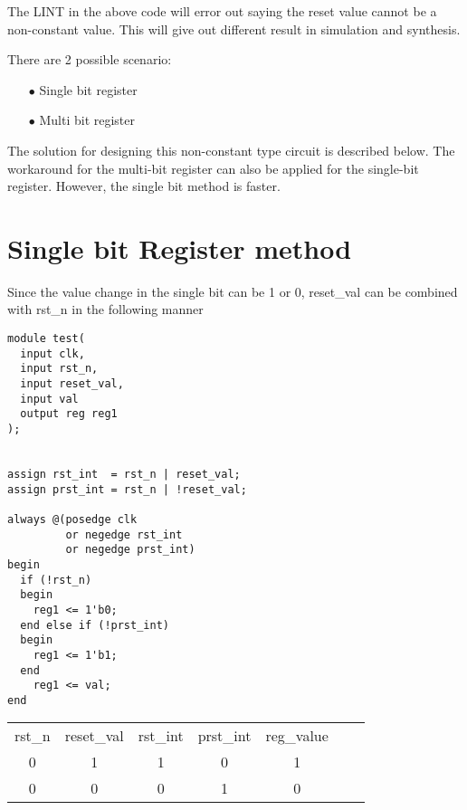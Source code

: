\documentclass[twocolumn,10pt]{asme2ej}
\begin{document}
The LINT in the above code will error out saying the reset value cannot be a non-constant value. This will give out different result in simulation and synthesis. 

There are 2 possible scenario:
\begin{itemize}
  \item[$\bullet$] Single bit register
  \item[$\bullet$] Multi bit register
\end{itemize}

The solution for designing this non-constant type circuit is described below. The workaround for the multi-bit register can also be applied for the single-bit register. However, the single bit method is faster.
\section{Single bit Register method}  

Since the value change in the single bit can be 1 or 0, reset\_val can be combined with rst\_n in the following manner \cite{mis}

\begin{verbatim}
module test(
  input clk,
  input rst_n,
  input reset_val,
  input val
  output reg reg1
);


assign rst_int  = rst_n | reset_val;
assign prst_int = rst_n | !reset_val;

always @(posedge clk 
         or negedge rst_int 
         or negedge prst_int) 
begin
  if (!rst_n) 
  begin
    reg1 <= 1'b0;
  end else if (!prst_int)
  begin
    reg1 <= 1'b1;
  end
    reg1 <= val;
end
\end{verbatim}


\begin{center}
\begin{tabular}{c c c c c c c}
\label {Truth table for the single bit non constant reset value}
& & \\ %
\hline
rst\_n& reset\_val & rst\_int & prst\_int & reg\_value \\
\hline
0 & 1 & 1 & 0 & 1 \\
0 & 0 & 0 & 1 & 0 \\
\hline
\end{tabular}
\end{center}
\end{document}
